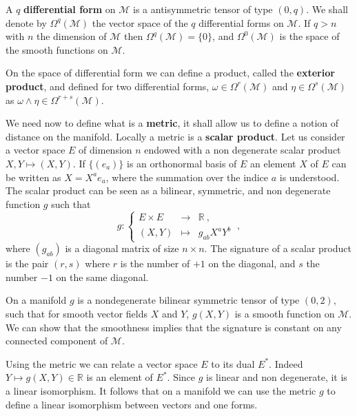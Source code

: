 \documentclass[10pt]{book}
\newcommand{\Mcal}{\mathcal{M}}
\newcommand{\Rbb}{\mathbb{R}}
\theoremstyle{break}
\begin{document}
\bigskip


A $q$ \textbf{differential form} on $\Mcal$ is a antisymmetric tensor of type $(0,q)$. We shall denote by $\Omega^q(\Mcal)$ the vector space of the $q$ differential forms on $\Mcal$. If $q > n$ with $n$ the dimension of $\Mcal$ then $\Omega^q(\Mcal)=\{0\}$, and $\Omega^0(\Mcal)$ is the space of the smooth functions on $\Mcal$.


\bigskip


On the space of differential form we can define a product, called the \textbf{exterior product}, and defined for two differential forms, $\omega \in \Omega^r(\Mcal)$ and $\eta \in \Omega^s(\Mcal)$ as $\omega \wedge \eta \in \Omega^{r+s}(\Mcal)$. 


\bigskip


We need now to define what is a \textbf{metric}, it shall allow us to define a notion of distance on the manifold. Locally a metric is a \textbf{scalar product}. Let us consider a vector space $E$ of dimension $n$ endowed with a non degenerate scalar product $X,Y \mapsto (X,Y)$. If $\{(e_a)\}$ is an orthonormal basis of $E$ an element $X$ of $E$ can be written as $X = X^a e_a$, where the summation over the indice $a$ is understood. The scalar product can be seen as a bilinear, symmetric, and non degenerate function $g$ such that
%
\begin{equation*}
g : \left\{ 
\begin{array}{lcl}
E \times E & \to & \Rbb \ , \\
(X,Y) & \mapsto & g_{ab} X^a Y^b
\end{array}
\right. \ ,
\end{equation*}
%
where $(g_{ab})$ is a diagonal matrix of size $n \times n$. The signature of a scalar product is the pair $(r,s)$ where $r$ is the number of $+1$ on the diagonal, and $s$ the number $-1$ on the same diagonal. 


\bigskip


On a manifold $g$ is a nondegenerate bilinear symmetric tensor of type $(0,2)$, such that for smooth vector fields $X$ and $Y$, $g(X,Y)$ is a smooth function on $\Mcal$. We can show that the smoothness implies that the signature is constant on any connected component of $\Mcal$. 


\bigskip


Using the metric we can relate a vector space $E$ to its dual $E^\ast$. Indeed $Y \mapsto g(X,Y) \in \Rbb$ is an element of $E^\ast$. Since $g$ is linear and non degenerate, it is a linear isomorphism. It follows that on a manifold we can use the metric $g$ to define a linear isomorphism between vectors and one forms. 
\end{document}
